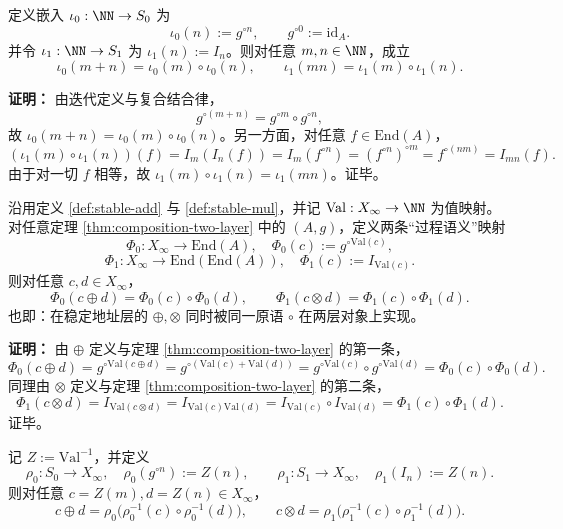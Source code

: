\begin{theorem}\label{thm:composition-two-layer}
定义嵌入 $\iota_0:\NN\to S_0$ 为
\[
\iota_0(n):=g^{\circ n},\qquad g^{\circ 0}:=\mathrm{id}_A.
\]
并令 $\iota_1:\NN\to S_1$ 为 $\iota_1(n):=I_n$。则对任意 $m,n\in\NN$，成立
\[
\iota_0(m+n)=\iota_0(m)\circ \iota_0(n),
\qquad
\iota_1(mn)=\iota_1(m)\circ \iota_1(n).
\]
\end{theorem}

\textbf{证明：}
由迭代定义与复合结合律，
\[
g^{\circ(m+n)}=g^{\circ m}\circ g^{\circ n},
\]
故 $\iota_0(m+n)=\iota_0(m)\circ \iota_0(n)$。另一方面，对任意 $f\in\mathrm{End}(A)$，
\[
(\iota_1(m)\circ \iota_1(n))(f)=I_m(I_n(f))=I_m(f^{\circ n})=(f^{\circ n})^{\circ m}
=f^{\circ (nm)}=I_{mn}(f).
\]
由于对一切 $f$ 相等，故 $\iota_1(m)\circ \iota_1(n)=\iota_1(mn)$。证毕。

\begin{theorem}\label{thm:arith-composition}
沿用定义 \ref{def:stable-add} 与 \ref{def:stable-mul}，并记 $\mathrm{Val}:X_\infty\to\NN$ 为值映射。对任意定理 \ref{thm:composition-two-layer} 中的 $(A,g)$，定义两条“过程语义”映射
\[
\Phi_0:X_\infty\to \mathrm{End}(A),\quad \Phi_0(c):=g^{\circ\mathrm{Val}(c)},
\]
\[
\Phi_1:X_\infty\to \mathrm{End}(\mathrm{End}(A)),\quad \Phi_1(c):=I_{\mathrm{Val}(c)}.
\]
则对任意 $c,d\in X_\infty$，
\[
\Phi_0(c\oplus d)=\Phi_0(c)\circ\Phi_0(d),\qquad
\Phi_1(c\otimes d)=\Phi_1(c)\circ\Phi_1(d).
\]
也即：在稳定地址层的 $\oplus,\otimes$ 同时被同一原语 $\circ$ 在两层对象上实现。
\end{theorem}

\textbf{证明：}
由 $\oplus$ 定义与定理 \ref{thm:composition-two-layer} 的第一条，
\[
\Phi_0(c\oplus d)=g^{\circ\mathrm{Val}(c\oplus d)}
=g^{\circ(\mathrm{Val}(c)+\mathrm{Val}(d))}
 =g^{\circ\mathrm{Val}(c)}\circ g^{\circ\mathrm{Val}(d)}
=\Phi_0(c)\circ\Phi_0(d).
\]
同理由 $\otimes$ 定义与定理 \ref{thm:composition-two-layer} 的第二条，
\[
\Phi_1(c\otimes d)=I_{\mathrm{Val}(c\otimes d)}
=I_{\mathrm{Val}(c)\mathrm{Val}(d)}
=I_{\mathrm{Val}(c)}\circ I_{\mathrm{Val}(d)}
=\Phi_1(c)\circ\Phi_1(d).
\]
证毕。

\begin{corollary}[仅复合的读出落回稳定地址]\label{cor:composition-pullback}
记 $Z:=\mathrm{Val}^{-1}$，并定义
\[
\rho_0:S_0\to X_\infty,\quad \rho_0(g^{\circ n}):=Z(n),\qquad
\rho_1:S_1\to X_\infty,\quad \rho_1(I_n):=Z(n).
\]
则对任意 $c=Z(m),d=Z(n)\in X_\infty$，
\[
c\oplus d=\rho_0\bigl(\rho_0^{-1}(c)\circ \rho_0^{-1}(d)\bigr),
\qquad
c\otimes d=\rho_1\bigl(\rho_1^{-1}(c)\circ \rho_1^{-1}(d)\bigr).
\]
\end{corollary}

